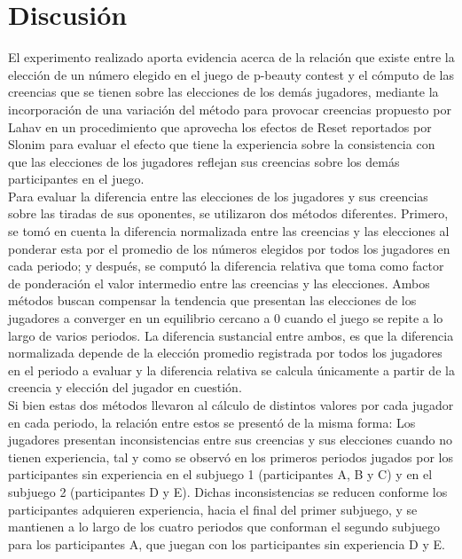 
\chapter{Discusión} %

\label{Cap_Disc} %
El experimento realizado aporta evidencia acerca de la relación que existe entre la elección de un número elegido en el juego de p-beauty contest y el cómputo de las creencias que se tienen sobre las elecciones de los demás jugadores, mediante la incorporación de una variación del método para provocar creencias propuesto por Lahav \parencite*{Lahav2015} en un procedimiento que aprovecha los efectos de Reset reportados por Slonim \parencite*{Slonim2005} para evaluar el efecto que tiene la experiencia sobre la consistencia con que las elecciones de los jugadores reflejan sus creencias sobre los demás participantes en el juego.\\

Para evaluar la diferencia entre las elecciones de los jugadores y sus creencias sobre las tiradas de sus oponentes, se utilizaron dos métodos diferentes. Primero, se tomó en cuenta la diferencia normalizada entre las creencias y las elecciones al ponderar esta por el promedio de los números elegidos por todos los jugadores en cada periodo; y después, se computó la diferencia relativa que toma como factor de ponderación el valor intermedio entre las creencias y las elecciones. Ambos métodos buscan compensar la tendencia que presentan las elecciones de los jugadores a converger en un equilibrio cercano a 0 cuando el juego se repite a lo largo de varios periodos. La diferencia sustancial entre ambos, es que la diferencia normalizada depende de la elección promedio registrada por todos los jugadores en el periodo a evaluar y  la diferencia relativa se calcula únicamente a partir de la creencia y elección del jugador en cuestión.\\

Si bien estas dos métodos llevaron al cálculo de distintos valores por cada jugador en cada periodo,  la relación entre estos se presentó de la misma forma: Los jugadores presentan inconsistencias entre sus creencias y sus elecciones cuando no tienen experiencia, tal y como se observó en los primeros periodos jugados por los participantes sin experiencia en el subjuego 1 (participantes A, B y C)  y en  el subjuego 2 (participantes D y E). Dichas inconsistencias se reducen conforme los participantes adquieren experiencia, hacia el final del primer subjuego, y se mantienen a lo largo de los cuatro periodos que conforman el segundo subjuego para los participantes A, que juegan con los participantes sin experiencia D y E.\\

